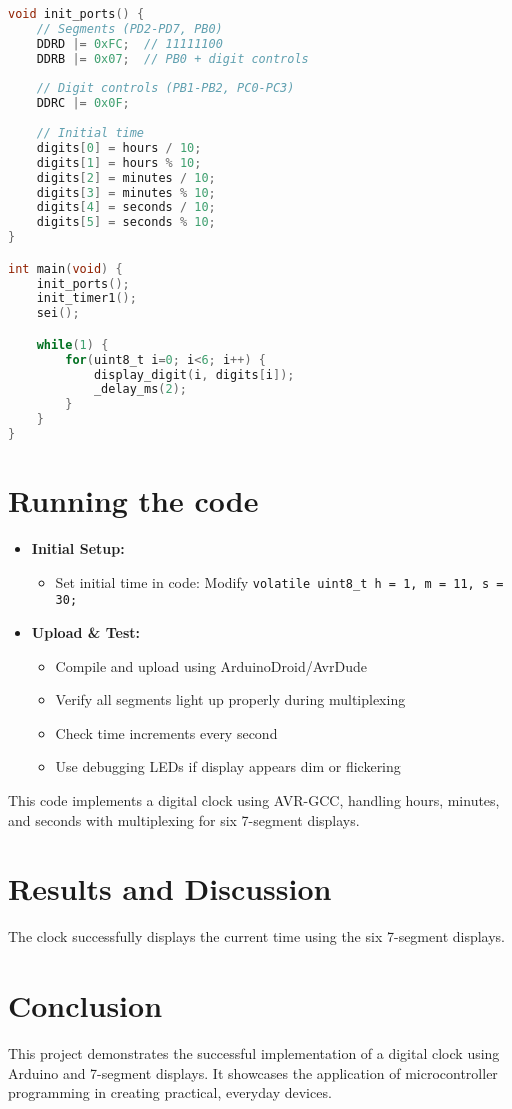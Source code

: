 \documentclass[journal]{IEEEtran}
\begin{document}
\begin{lstlisting}[language=C]
void init_ports() {
    // Segments (PD2-PD7, PB0)
    DDRD |= 0xFC;  // 11111100
    DDRB |= 0x07;  // PB0 + digit controls
    
    // Digit controls (PB1-PB2, PC0-PC3)
    DDRC |= 0x0F;
    
    // Initial time
    digits[0] = hours / 10;
    digits[1] = hours % 10;
    digits[2] = minutes / 10;
    digits[3] = minutes % 10;
    digits[4] = seconds / 10;
    digits[5] = seconds % 10;
}

int main(void) {
    init_ports();
    init_timer1();
    sei();

    while(1) {
        for(uint8_t i=0; i<6; i++) {
            display_digit(i, digits[i]);
            _delay_ms(2);
        }
    }
}
\end{lstlisting}
\section{Running the code}
\begin{itemize}
    
\item \textbf{Initial Setup:}
    \begin{itemize}
        \item Set initial time in code: Modify \texttt{volatile uint8\_t h = 1, m = 11, s = 30;}
    \end{itemize}
    
    \item \textbf{Upload \& Test:}
    \begin{itemize}
        \item Compile and upload using ArduinoDroid/AvrDude
        \item Verify all segments light up properly during multiplexing
        \item Check time increments every second
        \item Use debugging LEDs if display appears dim or flickering
    \end{itemize}
\end{itemize}
This code implements a digital clock using AVR-GCC, handling hours, minutes, and seconds with multiplexing for six 7-segment displays.


\section{Results and Discussion}
The clock successfully displays the current time using the six 7-segment displays. 
\section{Conclusion}
This project demonstrates the successful implementation of a digital clock using Arduino and 7-segment displays. It showcases the application of microcontroller programming in creating practical, everyday devices.




\end{document}
